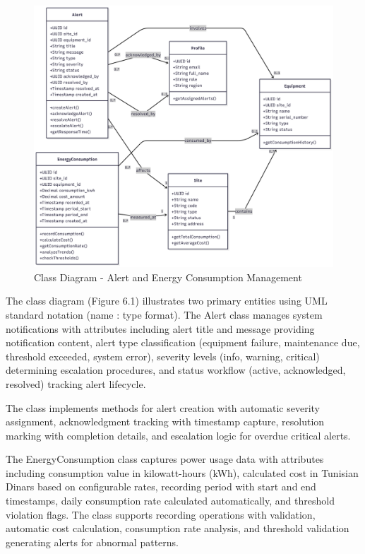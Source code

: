 \begin{figure}[H]
    \centering
    \includegraphics[width=0.95\linewidth]{img/chap_06/class_diagram_sprint4.png}
    \caption{Class Diagram - Alert and Energy Consumption Management}
    \label{fig:class_diagram_sprint4}
\end{figure}

The class diagram (Figure 6.1) illustrates two primary entities using UML standard notation (name : type format). The Alert class manages system notifications with attributes including alert title and message providing notification content, alert type classification (equipment failure, maintenance due, threshold exceeded, system error), severity levels (info, warning, critical) determining escalation procedures, and status workflow (active, acknowledged, resolved) tracking alert lifecycle.

The class implements methods for alert creation with automatic severity assignment, acknowledgment tracking with timestamp capture, resolution marking with completion details, and escalation logic for overdue critical alerts.

The EnergyConsumption class captures power usage data with attributes including consumption value in kilowatt-hours (kWh), calculated cost in Tunisian Dinars based on configurable rates, recording period with start and end timestamps, daily consumption rate calculated automatically, and threshold violation flags. The class supports recording operations with validation, automatic cost calculation, consumption rate analysis, and threshold validation generating alerts for abnormal patterns.

